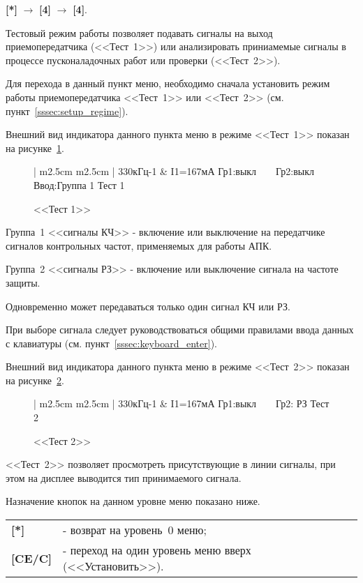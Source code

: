 \textbf{[*]} $\rightarrow$ \textbf{[4]} $\rightarrow$ \textbf{[4]}.

Тестовый режим работы позволяет подавать сигналы на выход приемопередатчика (<<Тест~1>>) или анализировать приниамемые сигналы в процессе пусконаладочных работ или проверки (<<Тест~2>>).

Для перехода в данный пункт меню, необходимо сначала установить режим работы приемопередатчика <<Тест~1>> или <<Тест~2>> (см. пункт~\ref{sssec:setup_regime}).

Внешний вид индикатора данного пункта меню в режиме <<Тест~1>> показан на рисунке~\ref{fig:setup_test_1}.
 
\begin{figure}[H]
	\centering
		
	\begin{tabular}{| m{2.5cm}  m{2.5cm} |}
		\firsthline
		330кГц-1	& \raggedleft I1=167мА			\tabularnewline 
		 {Гр1:выкл~~~~Гр2:выкл}	\tabularnewline
		 {Ввод:Группа 1} 		\tabularnewline 
		 {Тест 1}				\tabularnewline 
		\lasthline
	\end{tabular} 
	
	\caption{<<Тест 1>>}
	\label{fig:setup_test_1}
\end{figure}

Группа~1 <<сигналы КЧ>> - включение или выключение на передатчике сигналов контрольных частот, применяемых для работы АПК. 

Группа~2 <<сигналы РЗ>> - включение или выключение сигнала на частоте защиты. 

Одновременно может передаваться только один сигнал КЧ или РЗ.

При выборе сигнала следует руководствоваться общими правилами ввода данных с клавиатуры (см. пункт~\ref{sssec:keyboard_enter}).

Внешний вид индикатора данного пункта меню в режиме <<Тест~2>> показан на рисунке~\ref{fig:setup_test_2}.
 
\begin{figure}[H]
	\centering
	
	\begin{tabular}{| m{2.5cm}  m{2.5cm} |}
		\firsthline
		330кГц-1	& \raggedleft I1=167мА			\tabularnewline 
		 {Гр1:выкл~~~~Гр2: РЗ}	\tabularnewline
		 {} 					\tabularnewline 
		 {Тест 2}				\tabularnewline 
		\lasthline
	\end{tabular} 
	
	\caption{<<Тест 2>>}
	\label{fig:setup_test_2}
\end{figure}

<<Тест~2>> позволяет просмотреть присутствующие в линии сигналы, при этом на дисплее выводится тип принимаемого сигнала.

Назначение кнопок на данном уровне меню показано ниже.
\begin{center}
	\begin{tabular}{p{2cm} p{15cm}}
		\textbf{[*]} 			& - возврат на уровень~0 меню; \tabularnewline
		\textbf{[CE/C]} 		& - переход на один уровень меню вверх (<<Установить>>). \tabularnewline				
	\end{tabular}
\end{center} 
